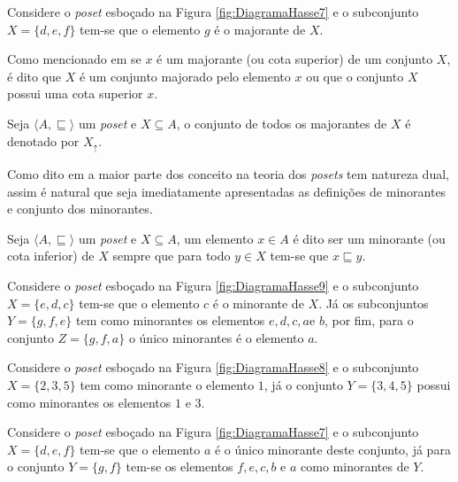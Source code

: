 \begin{exemplo}
	Considere o \textit{poset} esboçado na Figura \ref{fig:DiagramaHasse7} e o subconjunto $X = \{d, e, f\}$ tem-se que o elemento $g$ é o majorante de $X$.
\end{exemplo}

Como mencionado em \cite{abe1991-TC} se $x$ é um majorante (ou cota superior) de um conjunto $X$, é dito que $X$ é um conjunto majorado pelo elemento $x$ ou que o conjunto $X$ possui uma cota superior $x$.

\begin{definicao}\label{def:ConjuntoDosMajorantes}
	Seja $\langle A, \sqsubseteq \rangle$ um \textit{poset} e $X \subseteq A$, o conjunto de todos os majorantes de $X$ é denotado por $X_\uparrow$.
\end{definicao}

Como dito em \cite{abe1991-TC, carmo2013, morgado1962poset} a maior parte dos conceito na teoria dos \textit{posets} tem natureza dual, assim é natural que seja imediatamente apresentadas as definições de minorantes e conjunto dos minorantes.

\begin{definicao}[Minorante]\label{def:Mjnorante}
	Seja $\langle A, \sqsubseteq \rangle$ um \textit{poset} e $X \subseteq A$, um elemento $x \in A$ é dito ser um minorante (ou cota inferior) de $X$ sempre que para todo $y \in X$ tem-se que $x\sqsubseteq y$.
\end{definicao}

\begin{exemplo}
	Considere o \textit{poset} esboçado na Figura \ref{fig:DiagramaHasse9} e o subconjunto $X = \{e, d, c\}$ tem-se que o elemento $c$ é o minorante de $X$. Já os subconjuntos $Y = \{g, f, e\}$ tem como minorantes os elementos $e, d, c, a$e $b$, por fim, para o conjunto $Z = \{g, f, a\}$ o único minorantes é o elemento $a$.
\end{exemplo}

\begin{exemplo}
	Considere o \textit{poset} esboçado na Figura \ref{fig:DiagramaHasse8} e o subconjunto $X = \{2, 3, 5\}$  tem como minorante o elemento $1$, já o conjunto $Y = \{3, 4, 5\}$ possui como minorantes os elementos $1$ e $3$.
\end{exemplo}

\begin{exemplo}
	Considere o \textit{poset} esboçado na Figura \ref{fig:DiagramaHasse7} e o subconjunto $X = \{d, e, f\}$ tem-se que o elemento $a$ é o único minorante deste conjunto, já para o conjunto $Y = \{g, f\}$ tem-se os elementos $f, e, c, b$ e $a$ como minorantes de $Y$.
\end{exemplo}

